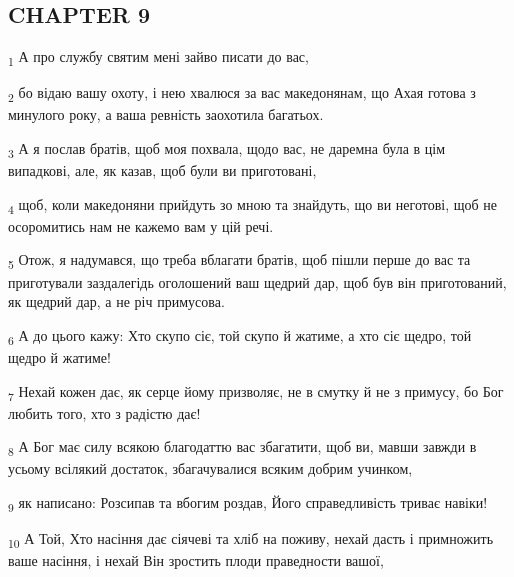 \subsection{CHAPTER 9}
\begin{tcolorbox}
\textsubscript{1} А про службу святим мені зайво писати до вас,
\end{tcolorbox}
\begin{tcolorbox}
\textsubscript{2} бо відаю вашу охоту, і нею хвалюся за вас македонянам, що Ахая готова з минулого року, а ваша ревність заохотила багатьох.
\end{tcolorbox}
\begin{tcolorbox}
\textsubscript{3} А я послав братів, щоб моя похвала, щодо вас, не даремна була в цім випадкові, але, як казав, щоб були ви приготовані,
\end{tcolorbox}
\begin{tcolorbox}
\textsubscript{4} щоб, коли македоняни прийдуть зо мною та знайдуть, що ви неготові, щоб не осоромитись нам не кажемо вам у цій речі.
\end{tcolorbox}
\begin{tcolorbox}
\textsubscript{5} Отож, я надумався, що треба вблагати братів, щоб пішли перше до вас та приготували заздалегідь оголошений ваш щедрий дар, щоб був він приготований, як щедрий дар, а не річ примусова.
\end{tcolorbox}
\begin{tcolorbox}
\textsubscript{6} А до цього кажу: Хто скупо сіє, той скупо й жатиме, а хто сіє щедро, той щедро й жатиме!
\end{tcolorbox}
\begin{tcolorbox}
\textsubscript{7} Нехай кожен дає, як серце йому призволяє, не в смутку й не з примусу, бо Бог любить того, хто з радістю дає!
\end{tcolorbox}
\begin{tcolorbox}
\textsubscript{8} А Бог має силу всякою благодаттю вас збагатити, щоб ви, мавши завжди в усьому всілякий достаток, збагачувалися всяким добрим учинком,
\end{tcolorbox}
\begin{tcolorbox}
\textsubscript{9} як написано: Розсипав та вбогим роздав, Його справедливість триває навіки!
\end{tcolorbox}
\begin{tcolorbox}
\textsubscript{10} А Той, Хто насіння дає сіячеві та хліб на поживу, нехай дасть і примножить ваше насіння, і нехай Він зростить плоди праведности вашої,
\end{tcolorbox}
